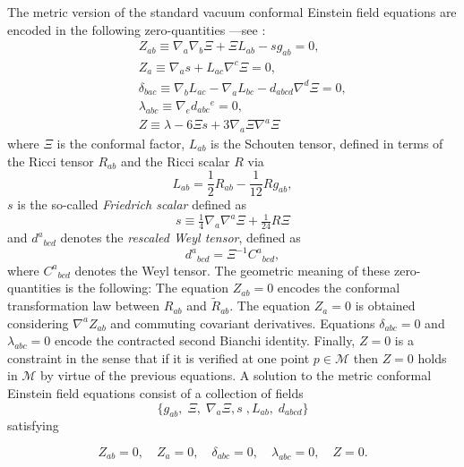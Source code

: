 \documentclass[10pt,a4paper]{article}
\theoremstyle{plain}
\begin{document}
The metric version of the standard vacuum conformal 
Einstein field equations are encoded in the following zero-quantities
  ---see \cite{Fri81a,Fri81b,Fri82,Fri83}:
\begin{subequations}\label{CFE_tensor_zeroquants}
\begin{eqnarray}
&& Z_{ab} \equiv \nabla_{a}\nabla_{b}\Xi  +\Xi L_{ab} - s g_{ab}=0 ,
 \label{StandardCEFEsecondderivativeCF}\\
&& Z_{a} \equiv \nabla_{a}s +L_{ac} \nabla ^{c}\Xi=0 , \label{standardCEFEs}\\
&& \delta_{bac} \equiv \nabla_{b}L_{ac}-\nabla_{a}L_{bc} -
 d_{abcd}\nabla^d{}\Xi =0 , \label{standardCEFESchouten}\\
&& \lambda_{abc}\equiv \nabla_{e}d_{abc}{}^{e}=0 , \label{standardCEFErescaledWeyl}\\
&& Z \equiv \lambda - 6 \Xi s + 3 \nabla_{a}\Xi \nabla^{a}\Xi
\label{standardCFEconstraintFriedrichScalar}
\end{eqnarray}
\end{subequations}
where $\Xi$ is the conformal factor, $L_{ab}$ is the Schouten tensor,
defined in terms of the Ricci tensor $R_{ab}$ and the Ricci scalar $R$
via
\begin{equation}\label{SchoutenDefinition}
L_{ab}=\frac{1}{2}R_{ab}-\frac{1}{12}Rg_{ab},
\end{equation}
 $s$ is the so-called \emph{Friedrich scalar} defined as
\begin{equation}\label{s-definition}
s\equiv \tfrac{1}{4}\nabla_{a}\nabla^{a}\Xi + \tfrac{1}{24}R\Xi
\end{equation}
and $d^{a}{}_{bcd}$ denotes the \emph{rescaled Weyl tensor}, defined
as
\[d^{a}{}_{bcd}=\Xi^{-1}C^{a}{}_{bcd},\]
where $C^{a}{}_{bcd}$ denotes the Weyl tensor.  The geometric meaning
of these zero-quantities is the following: The equation $Z_{ab}=0$
encodes the conformal transformation law between ${R}_{ab}$ and
$\tilde{R}_{ab}$.  The equation $Z_{a}=0$ is obtained considering
$\nabla^{a}Z_{ab}$ and commuting covariant derivatives.  Equations
$\delta_{abc}=0$ and $\lambda_{abc}=0$ encode the contracted second
Bianchi identity. Finally, $Z=0$ is a constraint in the sense that if
it is verified at one point $p\in\mathcal{M}$ then $Z=0$ holds in
$\mathcal{M}$ by virtue of the previous equations.  A solution to the
metric conformal Einstein field equations consist of a collection of
fields
\[
\{g_{ab}, \; \Xi, \; \nabla_{a}\Xi,s\;,L_{ab},\; d_{abcd}\}
\]
satisfying

\begin{equation}\label{vanishing_CFEs_tensorial_zq}
  Z_{ab}=0, \quad Z_{a}=0, \quad \delta_{abc}=0, \quad \lambda_{abc}=0, \quad Z=0.
\end{equation}
\end{document}
